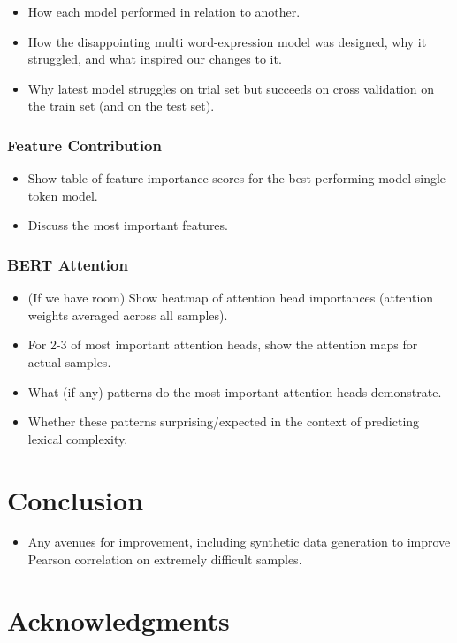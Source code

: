 \documentclass[11pt,a4paper]{article}
\begin{document}
\begin{itemize}
  \item How each model performed in relation to another.
  \item How the disappointing multi word-expression model was designed, why it struggled, and what inspired our changes to it.
  \item Why latest model struggles on trial set but succeeds on cross validation on the train set (and on the test set).
\end{itemize}

\subsubsection{Feature Contribution}

\begin{itemize}
  \item Show table of feature importance scores for the best performing model single token model.
  \item Discuss the most important features.
\end{itemize}

\subsubsection{BERT Attention}

\begin{itemize}
  \item (If we have room) Show heatmap of attention head importances (attention weights averaged across all samples).
  \item For 2-3 of most important attention heads, show the attention maps for actual samples.
  \item What (if any) patterns do the most important attention heads demonstrate.
  \item Whether these patterns surprising/expected in the context of predicting lexical complexity.
\end{itemize}

\section{Conclusion}
\begin{itemize}
  \item Any avenues for improvement, including synthetic data generation to improve Pearson correlation on extremely difficult samples.
\end{itemize}

\section*{Acknowledgments}




\end{document}
